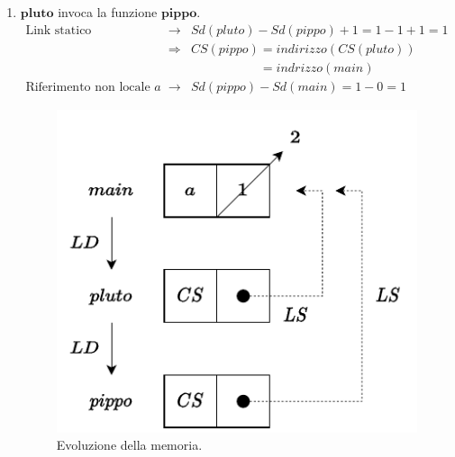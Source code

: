 \documentclass[a4paper]{article}
\begin{document}
\begin{enumerate}
		\item $\mathbf{pluto}$ invoca la funzione $\mathbf{pippo}$.
		\begin{equation*}
			\begin{array}{rcl}
				\text{Link statico} &\rightarrow& Sd(pluto) - Sd(pippo) + 1 = 1 - 1 + 1 = 1 \\ [.3em]
				&\Rightarrow& CS(pippo) = indirizzo(CS(pluto)) \\ [.3em]
				& &\phantom{ CS(pippo) }= indrizzo(main) \\ [.3em]
				\text{Riferimento non locale }a &\rightarrow& Sd(pippo) - Sd(main) = 1 - 0 = 1
			\end{array}
		\end{equation*}
		\begin{figure}[!htp]
			\centering
			\includegraphics[width=.6\textwidth]{img/ex3-3.pdf}
			\caption*{Evoluzione della memoria.}
		\end{figure}\newpage
		

\end{enumerate}
\end{document}
